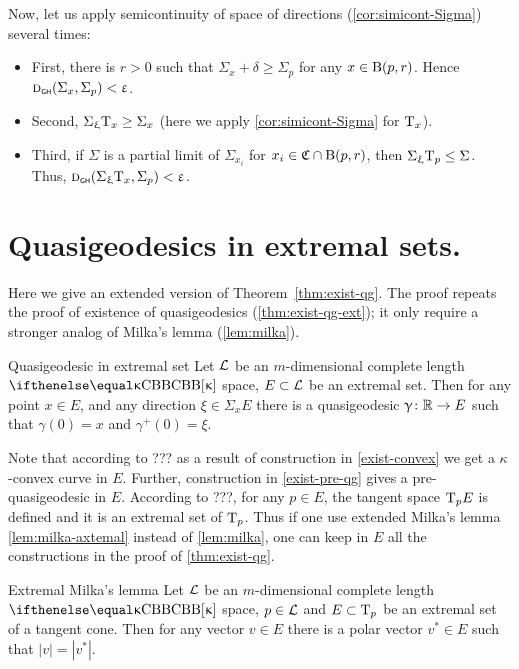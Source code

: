 Now, let us apply semicontinuity of space of directions (\ref{cor:simicont-Sigma}) several times:
\begin{itemize}
\item First, there is $r>0$ such that $\Sigma_x+\delta\ge\Sigma_p$ for any $x\in\oBall(p,r)$.
Hence $\text{\sc d}_{\text{\sf\tiny GH}}(\Sigma_x,\Sigma_p)<\upvarepsilon$.
\item Second, $\Sigma_\xi\T_x\ge\Sigma_x$ (here we apply \ref{cor:simicont-Sigma} for $\text{\rm T}_x$).
\item Third, if $\Sigma$ is a partial limit of $\Sigma_{x_i}$ for $x_i\in\mathfrak C\cap\oBall(p,r)$, then $\Sigma_\xi\T_p\le \Sigma$.
Thus, $\text{\sc d}_{\text{\sf\tiny GH}}(\Sigma_\upxi\text{\rm T}_x,\Sigma_p)<\upvarepsilon$.\qeds
\end{itemize}














\section{Quasigeodesics in extremal sets.}\label{qg-extrim}

Here we give an extended version of Theorem~\ref{thm:exist-qg}.
The proof repeats the proof of existence of quasigeodesics (\ref{thm:exist-qg-ext});
it only require a stronger analog of Milka's lemma (\ref{lem:milka}).

\begin{thm}{Quasigeodesic in extremal set}\label{thm:exist-qg-ext}
Let $\mathcal{L}$ be an $m$-dimensional complete length $\Alex{\kappa}$ space, 
$E\subset \spc{L}$ be an extremal set.
Then for any point $x\in E$, and any direction $\xi\in \Sigma_x E$
there is a quasigeodesic $\gamma\:\RR\to E$ such that $\gamma(0)=x$ and
$\gamma^+(0)=\xi$.
\end{thm}

Note that according to ??? as a result of construction in \ref{exist-convex} we get a $\kappa$-convex curve in $E$.
Further, construction in \ref{exist-pre-qg} gives a pre-quasigeodesic in $E$.
According to ???, for any $p\in E$, the tangent space $\text{\rm T}_p E$ is defined and it is an extremal set of $\text{\rm T}_p$.
Thus if one use extended Milka's lemma \ref{lem:milka-axtemal} instead of \ref{lem:milka}, one can keep in $E$ all the constructions in the proof of \ref{thm:exist-qg}. \qeds

\begin{thm}{Extremal Milka's lemma}\label{lem:milka-axtemal}
Let $\mathcal{L}$ be an $m$-dimensional complete length $\Alex\kappa$ space, 
$p\in \spc{L}$ 
and $E\subset \T_p$ be an extremal set of a tangent cone.
Then for any vector $v\in E$ there is a polar vector $v^*\in E$
such that $|v|=|v^*|$.
\end{thm}

